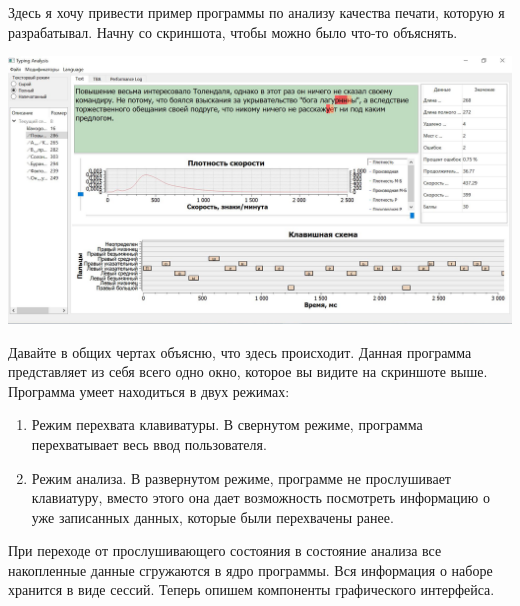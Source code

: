 Здесь я хочу привести пример программы по анализу качества печати, которую я разрабатывал.
Начну со скриншота, чтобы можно было что-то объяснять.
\begin{center}
\includegraphics[scale=0.355]{Figures/appfull.JPG}
\end{center}
Давайте в общих чертах объясню, что здесь происходит.
Данная программа представляет из себя всего одно окно, которое вы видите на скриншоте выше.
Программа умеет находиться в двух режимах:
\begin{enumerate}
\item Режим перехвата клавиватуры.
В свернутом режиме, программа перехватывает весь ввод пользователя.

\item Режим анализа.
В развернутом режиме, программе не прослушивает клавиатуру, вместо этого она дает возможность посмотреть информацию о уже записанных данных, которые были перехвачены ранее.
\end{enumerate}
При переходе от прослушивающего состояния в состояние анализа все накопленные данные сгружаются в ядро программы.
Вся информация о наборе хранится в виде сессий.
Теперь опишем компоненты графического интерфейса.
